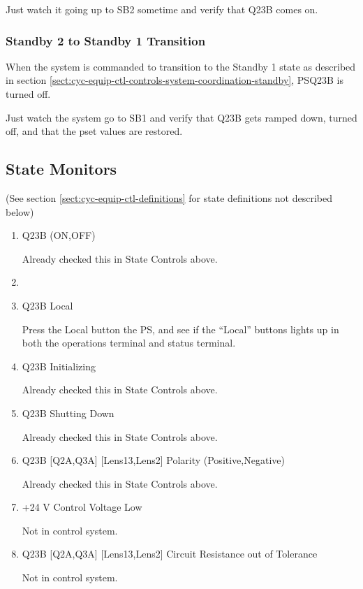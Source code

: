 \documentclass[11pt]{book}		%
\begin{document}
Just watch it going up to SB2 sometime and verify that Q23B comes on.

\color{black}

\subsubsection{Standby 2 to Standby 1 Transition} \label{sect:cyc-equip-ctl-beamline-quad23b-state-controls-sb2tosb1}

When the system is commanded to transition to the Standby 1 state as described in section \ref{sect:cyc-equip-ctl-controls-system-coordination-standby}, PSQ23B is turned off.

\color{red}

Just watch the system go to SB1 and verify that Q23B gets ramped down, turned off, and that the pset values are restored.

\color{black}


\subsection{State Monitors} \label{sect:cyc-equip-ctl-beamline-quad23b-state-monitors}
(See section \ref{sect:cyc-equip-ctl-definitions} for state definitions not described below)

\begin{enumerate}

\item Q23B (ON,OFF)

\color{red}
Already checked this in State Controls above.
\color{black}

\item \item Q23B Local

\color{red}
Press the Local button the PS, and see if the ``Local'' buttons lights up in both the operations terminal and status terminal.
\color{black}

\item Q23B Initializing

\color{red}
Already checked this in State Controls above.
\color{black}

 \item Q23B Shutting Down

\color{red}
Already checked this in State Controls above.
\color{black}

 \item Q23B [Q2A,Q3A] [Lens13,Lens2] Polarity (Positive,Negative)

\color{red}
Already checked this in State Controls above.
\color{black}

\item +24 V Control Voltage Low

\color{red}
Not in control system.
\color{black}

\item Q23B [Q2A,Q3A] [Lens13,Lens2] Circuit Resistance out of Tolerance

\color{red}
Not in control system.
\color{black}

\end{enumerate}
\end{document}
